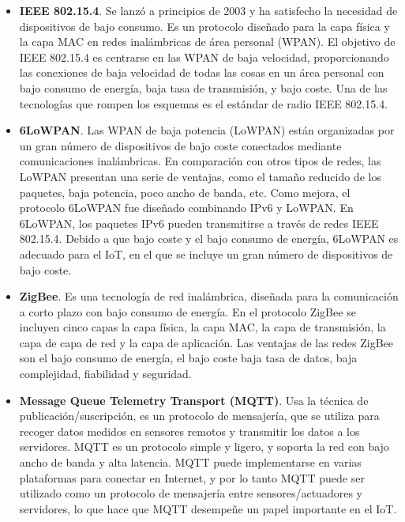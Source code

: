 {\begin{itemize}
    \item \textbf{IEEE 802.15.4}. Se lanzó a principios de 2003 y ha satisfecho la necesidad de dispositivos de bajo consumo. Es un protocolo diseñado para la capa física y la capa MAC en redes inalámbricas de área personal (WPAN). El objetivo de IEEE 802.15.4 es centrarse en las WPAN de baja velocidad, proporcionando las conexiones de baja velocidad de todas las cosas en un área personal con bajo consumo de energía, baja tasa de transmisión, y bajo coste. Una de las tecnologías que rompen los esquemas es el estándar de radio IEEE 802.15.4. \cite{8320780}
    \item \textbf{6LoWPAN}. Las WPAN de baja potencia (LoWPAN) están organizadas por un gran número de dispositivos de bajo coste conectados mediante comunicaciones inalámbricas. En comparación con otros tipos de redes, las LoWPAN presentan una serie de ventajas, como el tamaño reducido de los paquetes, baja potencia, poco ancho de banda, etc. Como mejora, el protocolo 6LoWPAN fue diseñado combinando IPv6 y LoWPAN. En 6LoWPAN, los paquetes IPv6 pueden transmitirse a través de redes IEEE 802.15.4. Debido a que bajo coste y el bajo consumo de energía, 6LoWPAN es adecuado para el IoT, en el que se incluye un gran número de dispositivos de bajo coste.
    \item \textbf{ZigBee}. Es una tecnología de red inalámbrica, diseñada para la comunicación a corto plazo con bajo consumo de energía. En el protocolo ZigBee se incluyen cinco capas la capa física, la capa MAC, la capa de transmisión, la capa de capa de red y la capa de aplicación. Las ventajas de las redes ZigBee son el bajo consumo de energía, el bajo coste baja tasa de datos, baja complejidad, fiabilidad y seguridad.
    \item \textbf{Message Queue Telemetry Transport (MQTT)}. Usa la técnica de publicación/suscripción, es un protocolo de mensajería, que se utiliza para recoger datos medidos en sensores remotos y transmitir los datos a los servidores. MQTT es un protocolo simple y ligero, y soporta la red con bajo ancho de banda y alta latencia. MQTT puede implementarse en varias plataformas para conectar en Internet, y por lo tanto MQTT puede ser utilizado como un protocolo de mensajería entre sensores/actuadores y servidores, lo que hace que MQTT desempeñe un papel importante en el IoT.

\end{itemize}}
